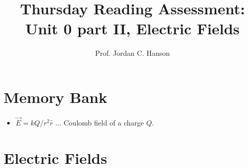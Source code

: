 \documentclass{article}
\begin{document}
\title{Thursday Reading Assessment: Unit 0 part II, Electric Fields}
\author{Prof. Jordan C. Hanson}

\maketitle

\section{Memory Bank}

\begin{itemize}
\item $\vec{E} = k Q / r^2 \hat{r}$ ... Coulomb field of a charge $Q$.
\end{itemize}

\section{Electric Fields}
\end{document}
